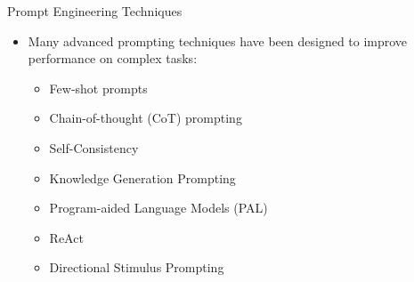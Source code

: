 \begin{frame}{Prompt Engineering Techniques}
  \begin{itemize}
    \item Many advanced prompting techniques have been designed to improve performance on complex tasks:
    \begin{itemize}
      \item Few-shot prompts
      \item Chain-of-thought (CoT) prompting
      \item Self-Consistency
      \item Knowledge Generation Prompting
      \item Program-aided Language Models (PAL)
      \item ReAct
      \item Directional Stimulus Prompting
    \end{itemize}
  \end{itemize}
\end{frame}
